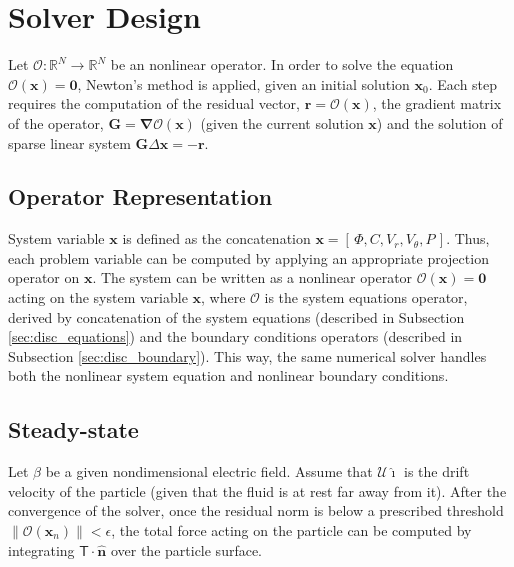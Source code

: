 \documentclass[MSc,beforeExam]{iitcsthesis}
\newcommand{\R}{\ensuremath{\mathbb{R}}}
\newcommand\bnabla{\boldsymbol{\nabla}}
\newcommand\bn{\boldsymbol{\hat{n}}}
\newcommand\bG{\boldsymbol{G}}
\newcommand\bx{\boldsymbol{x}}
\newcommand\br{\boldsymbol{r}}
\newcommand\bzero{\boldsymbol{0}}
\newcommand\cO{\mathcal{O}}
\newcommand\cU{\mathscr{U}}
\newcommand\tT{\mathsf{T}}
\newcommand\ui{\boldsymbol{\hat{\imath}}}
\begin{document}
\section{Solver Design}
Let $\cO : \R^N \rightarrow \R^N $ be an nonlinear operator.
In order to solve the equation $\cO(\bx) = \bzero$, Newton's method is applied, 
given an initial solution $\bx_0$.
Each step requires the computation of the residual vector, $\br = \cO(\bx)$, 
the gradient matrix of the operator, $\bG = \bnabla \cO(\bx)$
(given the current solution $\bx$)
and the solution of sparse linear system $\bG \Delta \bx = -\br$.

\subsection{Operator Representation}
System variable $\bx$ is defined as the concatenation $\bx = [\,\varPhi, C, V_r, V_\theta, P\,]$.
Thus, each problem variable can be computed by applying an appropriate projection operator on $\bx$.
The system can be written as a nonlinear operator $\cO(\bx) = \bzero$ 
acting on the system variable ${\bx}$, 
where $\cO$ is the system equations operator, 
derived by concatenation of the system equations (described in Subsection \ref{sec:disc_equations})
and the boundary conditions operators (described in Subsection \ref{sec:disc_boundary}).
This way, the same numerical solver handles both the nonlinear system equation and nonlinear
boundary conditions.

\subsection{Steady-state}
Let $\beta$ be a given nondimensional electric field.
Assume that $\cU \ui$ is the drift velocity of the particle 
(given that the fluid is at rest far away from it).
After the convergence of the solver, once the residual norm is below
a prescribed threshold $\|\cO(\bx_n)\| < \epsilon$, 
the total force acting on the particle  
can be computed by integrating $\tT \cdot \bn$ over the particle surface.
\end{document}
